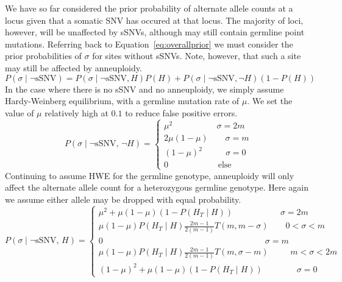 \documentclass[../../main.tex]{subfiles}
\begin{document}
We have so far considered the prior probability of alternate allele counts at a locus given that a somatic SNV has occured at that locus. The majority of loci, however, will be unaffected by sSNVs, although may still contain germline point mutations. Referring back to Equation~\eqref{eq:overallprior} we must consider the prior probabilities of $\sigma$ for sites without sSNVs. Note, however, that such a site may still be affected by anneuploidy.
\begin{equation}
P(\sigma\mid\neg\text{sSNV})=P(\sigma\mid\neg\text{sSNV},H)P(H)+P(\sigma\mid\neg\text{sSNV},\neg H)(1-P(H))
\end{equation} 
In the case where there is no sSNV and no anneuploidy, we simply assume Hardy-Weinberg equilibrium, with a germline mutation rate of $\mu$. We set the value of $\mu$ relatively high at $0.1$ to reduce false positive errors.
\begin{equation*}
P(\sigma\mid\neg\text{sSNV},\,\neg H) = \begin{cases} \mu^2\qquad\qquad\quad\,\sigma=2m\\ 2\mu(1-\mu) \qquad \sigma = m \\ (1-\mu)^2 \qquad \; \;\, \sigma=0 \\ 0 \qquad\qquad\quad\;\;\; \text{else} \end{cases}
\end{equation*}
Continuing to assume HWE for the germline genotype, anneuploidy will only affect the alternate allele count for a heterozygous germline genotype. Here again we assume either allele may be dropped with equal probability.
\begin{equation*}
P(\sigma\mid\neg\text{sSNV},\, H) = \begin{cases} \mu^2 + \mu(1-\mu)(1-P(H_T\mid H))\qquad\qquad\quad\;\; \sigma=2m\\
\mu(1-\mu)P(H_T\mid H)\frac{2m-1}{2(m-1)}T(m,m-\sigma) \qquad 0<\sigma<m\\
0 \qquad\qquad\qquad\qquad\qquad\qquad\qquad\qquad\qquad\quad \sigma=m \\
\mu(1-\mu)P(H_T\mid H)\frac{2m-1}{2(m-1)}T(m,\sigma-m) \qquad\;\; m<\sigma<2m\\
(1-\mu)^2 + \mu(1-\mu)(1-P(H_T\mid H)) \qquad\qquad \sigma=0 \end{cases}
\end{equation*}
\end{document}
